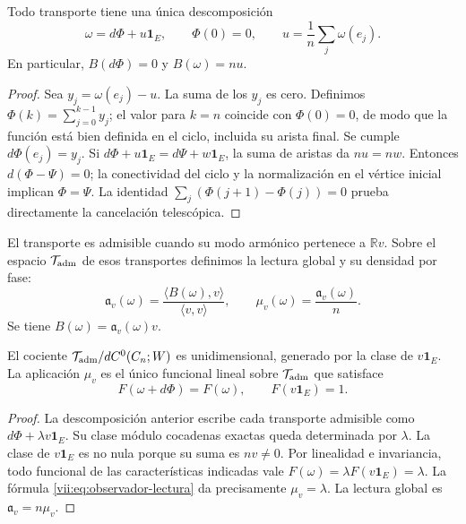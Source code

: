 \begin{theorem}
\label{vii:thm:observador-descomposicion}
Todo transporte tiene una única descomposición
\[
 \omega=d\Phi+u\mathbf1_E,\qquad \Phi(0)=0,
 \qquad u=\frac1n\sum_j\omega(e_j).
\]
En particular, \(B(d\Phi)=0\) y \(B(\omega)=nu\).
\end{theorem}

\begin{proof}
Sea \(y_j=\omega(e_j)-u\). La suma de los \(y_j\) es cero.
Definimos \(\Phi(k)=\sum_{j=0}^{k-1}y_j\); el valor para \(k=n\)
coincide con \(\Phi(0)=0\), de modo que la función está bien definida
en el ciclo, incluida su arista final. Se cumple \(d\Phi(e_j)=y_j\).
Si \(d\Phi+u\mathbf1_E=d\Psi+w\mathbf1_E\), la suma de aristas da
\(nu=nw\). Entonces \(d(\Phi-\Psi)=0\); la conectividad del ciclo
y la normalización en el vértice inicial implican \(\Phi=\Psi\).
La identidad \(\sum_j(\Phi(j+1)-\Phi(j))=0\) prueba directamente
la cancelación telescópica.
\end{proof}

\begin{definition}
\label{vii:def:observador-admisible}
El transporte es admisible cuando su modo armónico pertenece a
\(\mathbb Rv\). Sobre el espacio \(\mathcal T_{\rm adm}\) de esos
transportes definimos la lectura global y su densidad por fase:
\begin{equation}
 \mathfrak a_v(\omega)
 =\frac{\langle B(\omega),v\rangle}{\langle v,v\rangle},
 \qquad
 \mu_v(\omega)=\frac{\mathfrak a_v(\omega)}n.
 \label{vii:eq:observador-lectura}
\end{equation}
Se tiene \(B(\omega)=\mathfrak a_v(\omega)v\).
\end{definition}

\begin{theorem}
\label{vii:thm:observador-unicidad}
El cociente
\(\mathcal T_{\rm adm}/dC^0(C_n;W)\) es unidimensional, generado
por la clase de \(v\mathbf1_E\). La aplicación \(\mu_v\) es el
único funcional lineal sobre \(\mathcal T_{\rm adm}\) que satisface
\[
 F(\omega+d\Phi)=F(\omega),\qquad F(v\mathbf1_E)=1.
\]
\end{theorem}

\begin{proof}
La descomposición anterior escribe cada transporte admisible como
\(d\Phi+\lambda v\mathbf1_E\). Su clase módulo cocadenas exactas
queda determinada por \(\lambda\). La clase de \(v\mathbf1_E\)
es no nula porque su suma es \(nv\neq0\). Por linealidad e
invariancia, todo funcional de las características indicadas vale
\(F(\omega)=\lambda F(v\mathbf1_E)=\lambda\). La fórmula
\eqref{vii:eq:observador-lectura} da precisamente \(\mu_v=\lambda\).
La lectura global es \(\mathfrak a_v=n\mu_v\).
\end{proof}

